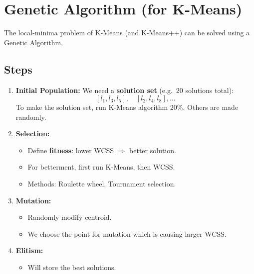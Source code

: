 \documentclass[12pt,a4paper]{article}
\begin{document}
\section{Genetic Algorithm (for K-Means)}

\begin{definitionbox}
The local-minima problem of K-Means (and K-Means++) can be solved using a Genetic Algorithm.
\end{definitionbox}

\subsection{Steps}

\begin{enumerate}[leftmargin=*, label=\textbf{\arabic*.}]
  \item \textbf{Initial Population:}
        We need a \textbf{solution set} (e.g.\ 20 solutions total):
        \[
        [l_1, l_3, l_5],\quad [l_2, l_4, l_8], \ldots
        \]
        To make the solution set, run K-Means algorithm 20\%. Others are made randomly.

  \item \textbf{Selection:}
        \begin{itemize}
          \item Define \textbf{fitness}: lower WCSS $\Rightarrow$ better solution.
          \item For betterment, first run K-Means, then WCSS.
          \item Methods: Roulette wheel, Tournament selection.
        \end{itemize}

  \item \textbf{Mutation:}
        \begin{itemize}
          \item Randomly modify centroid.
          \item We choose the point for mutation which is causing larger WCSS.
        \end{itemize}

  \item \textbf{Elitism:}
        \begin{itemize}
          \item Will store the best solutions.
        \end{itemize}
\end{enumerate}
\end{document}
